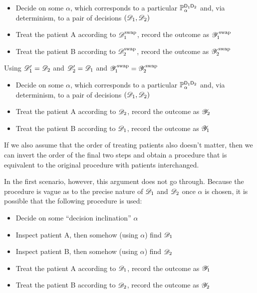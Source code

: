 \begin{itemize}
    \item Decide on some $\alpha$, which corresponds to a particular $\mathbb{P}_\alpha^{\mathsf{D}_1\mathsf{D}_2}$ and, via determinism, to a pair of decisions $(\mathscr{D}_1,\mathscr{D}_2)$
     \item Treat the patient A according to $\mathscr{D}^{\text{swap}}_1$, record the outcome as $\mathscr{Y}_1^{\text{swap}}$
    \item Treat the patient B according to $\mathscr{D}^{\text{swap}}_2$, record the outcome as $\mathscr{Y}_2^{\text{swap}}$
\end{itemize}

Using $\mathscr{D}_1'=\mathscr{D}_2$ and $\mathscr{D}_2'=\mathscr{D}_1$ and $\mathscr{Y}_1^{\text{swap}}=\mathscr{Y}_2^{\text{swap}}$

\begin{itemize}
    \item Decide on some $\alpha$, which corresponds to a particular $\mathbb{P}_\alpha^{\mathsf{D}_1\mathsf{D}_2}$ and, via determinism, to a pair of decisions $(\mathscr{D}_1,\mathscr{D}_2)$
    \item Treat the patient A according to $\mathscr{D}_2$, record the outcome as $\mathscr{Y}_2$
    \item Treat the patient B according to $\mathscr{D}_1$, record the outcome as $\mathscr{Y}_1$
\end{itemize}

If we also assume that the order of treating patients also doesn't matter, then we can invert the order of the final two steps and obtain a procedure that is equivalent to the original procedure with patients interchanged.

In the first scenario, however, this argument does not go through. Because the procedure is vague as to the precise nature of $\mathscr{D}_1$ and $\mathscr{D}_2$ once $\alpha$ is chosen, it is possible that the following procedure is used:

\begin{itemize}
    \item Decide on some ``decision inclination'' $\alpha$
    \item Inspect patient A, then somehow (using $\alpha$) find $\mathscr{D}_1$
    \item Inspect patient B, then somehow (using $\alpha$) find $\mathscr{D}_2$
    \item Treat the patient A according to $\mathscr{D}_1$, record the outcome as $\mathscr{Y}_1$
    \item Treat the patient B according to $\mathscr{D}_2$, record the outcome as $\mathscr{Y}_2$
\end{itemize}


